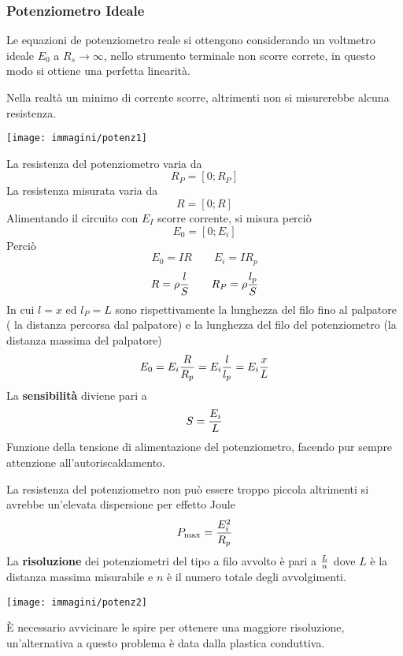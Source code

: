 \documentclass[a4paper, 15pt]{article}
\begin{document}
\subsubsection{Potenziometro Ideale}
\begin{adjustwidth}{2in}{}
	Le equazioni de potenziometro reale si ottengono considerando un voltmetro ideale $E_0$ a $R_s\rightarrow\infty$, nello strumento terminale non scorre correte, in questo modo si ottiene una perfetta linearità. 
	
	Nella realtà un minimo di corrente scorre, altrimenti non si misurerebbe alcuna resistenza.
	\begin{center}
		\texttt{[image: immagini/potenz1]}
	\end{center}
	La resistenza del potenziometro varia da 
	\[R_P = [0;R_P]\]
	La resistenza misurata varia da 
	\[R = [0;R]\]
	Alimentando il circuito con $E_I$ scorre corrente, si misura perciò
	\[E_0 = [0;E_i]\]
	Perciò
	\[E_0 = IR \qquad E_i = IR_p\]
	\[R = \rho{l\over S} \qquad R_P = \rho{l_p\over S}\]
	In cui $l = x$ ed $l_P = L$ sono rispettivamente la lunghezza del filo fino al palpatore ( la distanza percorsa dal palpatore) e la lunghezza del filo del potenziometro (la distanza massima del palpatore)
	\[E_0 = E_i{R\over R_p} = E_i{l\over l_p} = E_i{x\over L}\]
	La \textbf{sensibilità} diviene pari a
	\[S = {E_i\over L}\]
	Funzione della tensione di alimentazione del potenziometro, facendo pur sempre attenzione all'autoriscaldamento. 
	
	La resistenza del potenziometro non può essere troppo piccola altrimenti si avrebbe un'elevata dispersione per effetto Joule 
	\[P_{\max}= {E_i^2\over R_p}\]
	La \textbf{risoluzione} dei potenziometri del tipo a filo avvolto è pari a ${L\over n}$ dove $L$ è la distanza massima misurabile e $n$ è il numero totale degli avvolgimenti. 
	\begin{center}
		\texttt{[image: immagini/potenz2]}
	\end{center}
	È necessario avvicinare le spire per ottenere una maggiore risoluzione, un'alternativa a questo problema è data dalla plastica conduttiva.	
\end{adjustwidth}
\end{document}
